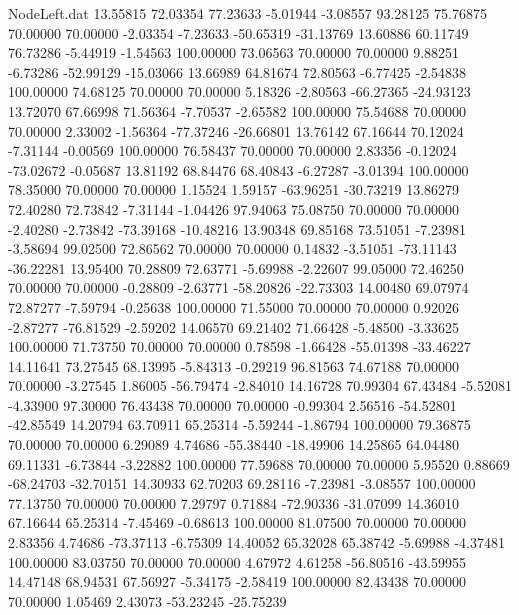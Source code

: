 \begin{filecontents}{NodeLeft.dat}
  13.55815   72.03354   77.23633    -5.01944   -3.08557   93.28125   75.76875   70.00000   70.00000   -2.03354   -7.23633  -50.65319  -31.13769
  13.60886   60.11749   76.73286    -5.44919   -1.54563  100.00000   73.06563   70.00000   70.00000    9.88251   -6.73286  -52.99129  -15.03066
  13.66989   64.81674   72.80563    -6.77425   -2.54838  100.00000   74.68125   70.00000   70.00000    5.18326   -2.80563  -66.27365  -24.93123
  13.72070   67.66998   71.56364    -7.70537   -2.65582  100.00000   75.54688   70.00000   70.00000    2.33002   -1.56364  -77.37246  -26.66801
  13.76142   67.16644   70.12024    -7.31144   -0.00569  100.00000   76.58437   70.00000   70.00000    2.83356   -0.12024  -73.02672   -0.05687
  13.81192   68.84476   68.40843    -6.27287   -3.01394  100.00000   78.35000   70.00000   70.00000    1.15524    1.59157  -63.96251  -30.73219
  13.86279   72.40280   72.73842    -7.31144   -1.04426   97.94063   75.08750   70.00000   70.00000   -2.40280   -2.73842  -73.39168  -10.48216
  13.90348   69.85168   73.51051    -7.23981   -3.58694   99.02500   72.86562   70.00000   70.00000    0.14832   -3.51051  -73.11143  -36.22281
  13.95400   70.28809   72.63771    -5.69988   -2.22607   99.05000   72.46250   70.00000   70.00000   -0.28809   -2.63771  -58.20826  -22.73303
  14.00480   69.07974   72.87277    -7.59794   -0.25638  100.00000   71.55000   70.00000   70.00000    0.92026   -2.87277  -76.81529   -2.59202
  14.06570   69.21402   71.66428    -5.48500   -3.33625  100.00000   71.73750   70.00000   70.00000    0.78598   -1.66428  -55.01398  -33.46227
  14.11641   73.27545   68.13995    -5.84313   -0.29219   96.81563   74.67188   70.00000   70.00000   -3.27545    1.86005  -56.79474   -2.84010
  14.16728   70.99304   67.43484    -5.52081   -4.33900   97.30000   76.43438   70.00000   70.00000   -0.99304    2.56516  -54.52801  -42.85549
  14.20794   63.70911   65.25314    -5.59244   -1.86794  100.00000   79.36875   70.00000   70.00000    6.29089    4.74686  -55.38440  -18.49906
  14.25865   64.04480   69.11331    -6.73844   -3.22882  100.00000   77.59688   70.00000   70.00000    5.95520    0.88669  -68.24703  -32.70151
  14.30933   62.70203   69.28116    -7.23981   -3.08557  100.00000   77.13750   70.00000   70.00000    7.29797    0.71884  -72.90336  -31.07099
  14.36010   67.16644   65.25314    -7.45469   -0.68613  100.00000   81.07500   70.00000   70.00000    2.83356    4.74686  -73.37113   -6.75309
  14.40052   65.32028   65.38742    -5.69988   -4.37481  100.00000   83.03750   70.00000   70.00000    4.67972    4.61258  -56.80516  -43.59955
  14.47148   68.94531   67.56927    -5.34175   -2.58419  100.00000   82.43438   70.00000   70.00000    1.05469    2.43073  -53.23245  -25.75239

\end{filecontents}
